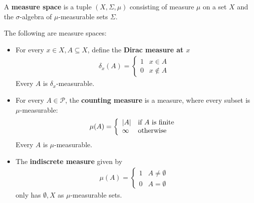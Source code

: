 \begin{dfn}[]
  A \textbf{measure space} is a tuple $(X, \Sigma, \mu)$ consisting of measure $\mu$ on a set $X$ and the $\sigma$-algebra of $\mu$-measurable sets $\Sigma$.
\end{dfn}


\begin{ex}[]\label{ex:dirac-counting-indiscrete}
  The following are measure spaces:
  \begin{itemize} 
    \item For every $x \in X, A \subseteq X$, define the \textbf{Dirac measure at $x$}
      \begin{align*}
        \delta_x(A) =\left\{\begin{array}{ll}
            1 & x \in A \\
            0 & x \notin A
        \end{array} \right.
      \end{align*}
      Every $A$ is $\delta_x$-measurable.
    \item For every $A \in \mathcal{P}$, the \textbf{counting measure} is a measure, where every subset is $\mu$-measurable:
      \begin{align*}
        \mu(A) = \left\{\begin{array}{ll}
            \vert A\vert & \text{if $A$ is finite} \\
           \infty & \text{otherwise}
        \end{array} \right.
      \end{align*}
      Every $A$ is $\mu$-measurable.
    \item The \textbf{indiscrete measure} given by
      \begin{align*}
        \mu(A) = \left\{\begin{array}{ll}
          1 & A \neq \emptyset \\
          0 & A = \emptyset
        \end{array} \right.
      \end{align*}
      only has $\emptyset,X$ as $\mu$-measurable sets.
  \end{itemize}
\end{ex}
